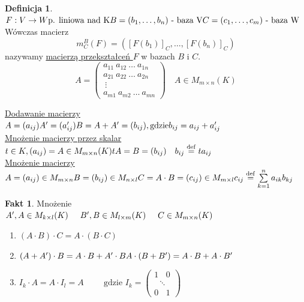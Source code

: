 \documentclass[12pt,a4paper]{article}
\theoremstyle{plain}
\theoremstyle{definition}
\newtheorem{ft}{Fakt}[section]
\theoremstyle{definition}
\newtheorem{df}{Definicja}[section]
\theoremstyle{definition}
\theoremstyle{definition}
\theoremstyle{definition}
\theoremstyle{definition}
\theoremstyle{definition}
\theoremstyle{definition}
\theoremstyle{definition}
\begin{document}
\begin{df} 
    $ 
        F: V \rightarrow W \text{p. liniowa nad K} \\
        B = (b_1,\dots,b_n) \text{ - baza V} \\
        C = (c_1, \dots,c_m) \text{ - baza W} \\
    $
    Wówczas macierz \\
        $$m^B_C (F) = ([F(b_1)]_C,\dots,[F(b_n)]_C)$$ nazywamy \underline{macierzą przekształceń $F$} w bazach $B$ i $C$. 
    $$ A = \begin{pmatrix} a_{11} \ a_{12} \ \dots \ a_{1n} \\
                           a_{21} \ a_{22} \ \dots \ a_{2n} \\
                                   \        \vdots \  \\
                           a_{m1} \ a_{m2} \ \dots \ a_{mn}
    \end{pmatrix} \quad A \in M_{m \times n} (K)$$
\end{df}
\noindent 
\underline{Dodawanie macierzy} \\
$ 
  A = (a_{ij}) \\
  A' =(a'_{ij}) \\ 
  B = A + A' = (b_{ij}), \text{gdzie} b_{ij} = a_{ij} + a'_{ij}
$ \\
\underline{Mnożenie macierzy przez skalar} \\ 
$ 
    t \in K, (a_{ij}) = A \in M_{m \times n}(K) \\
    tA = B = (b_{ij}) \quad b_{ij} \overset{\mathrm{def}}{=} t a_{ij}
$ \\
\underline{Mnożenie macierzy} \\ 
$
    A = (a_{ij}) \in M_{m \times n} \\
    B = (b_{ij}) \in M_{n \times l} \\ 
    C = A \cdot B = (c_{ij}) \in M_{m \times l} \\
    c_{ij} \overset{\mathrm{def}}{=} \sum\limits_{k=1}^n a_{ik}b_{kj}
$
\begin{ft}
    Mnożenie \\
    $A', A \in M_{k \times l} (K) \hspace{0.5cm} B', B \in M_{l \times m} (K) \hspace{0.5cm} C \in M_{m \times n} (K)$
    \begin{enumerate}[{(}1{)}]
        \item $ (A \cdot B) \cdot C = A \cdot (B \cdot C)$
        \item $ (A + A') \cdot B = A \cdot B + A' \cdot B \\
            A \cdot (B + B') = A \cdot B + A \cdot B' $
        \item $ I_k \cdot A = A  \cdot I_l = A  \hspace{1cm} \text{gdzie } I_k = \begin{pmatrix} 
                1 \ ~~ \ 0 \\ ~~ \ \ddots \ ~~ \\ 0 \ ~~ \ 1
            \end{pmatrix} $
    \end{enumerate}
\end{ft}
\end{document}
